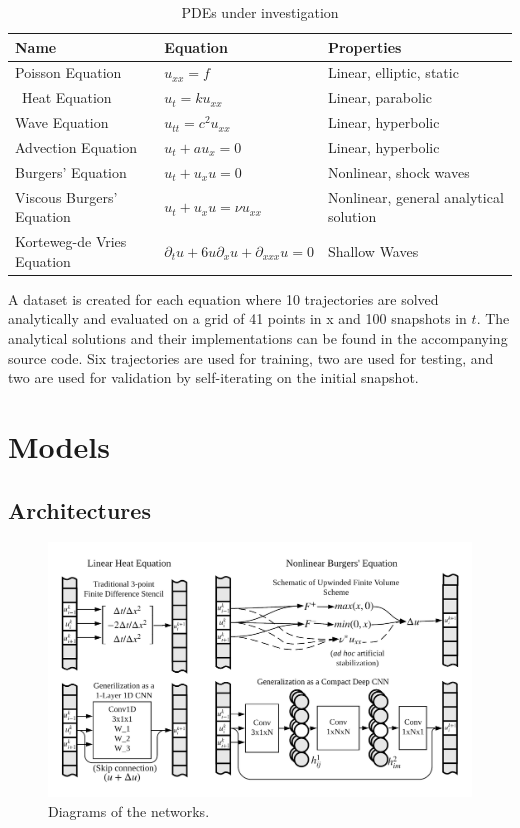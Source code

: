 \documentclass{article}
\begin{document}
\begin{table}
  \caption{\label{tab:pdes}PDEs under investigation}
  \begin{tabular}{lll}
    \hline
    Name & Equation & Properties\\
    \hline\hline
    Poisson Equation & $u_{xx} = f $ & Linear, elliptic, static \\\hline\
    Heat Equation & $u_{t} = k u_{xx} $ & Linear, parabolic \\\hline
    Wave Equation & $u_{tt} = c^2 u_{xx} $ & Linear, hyperbolic\\\hline
    Advection Equation & $u_{t} + a u_x = 0 $ & Linear, hyperbolic\\\hline
    Burgers' Equation & $u_{t} + u_x u = 0 $ & Nonlinear, shock waves \\\hline
    Viscous Burgers' Equation & $u_{t} + u_x u = \nu u_{xx} $ & Nonlinear, general analytical solution \\\hline
    Korteweg-de Vries Equation & $\partial_t u + 6 u \partial_x u + \partial_{xxx}u = 0$ & Shallow Waves \\\hline
  \end{tabular}
\end{table}

A dataset is created for each equation where 10 trajectories are solved analytically and evaluated on a grid of 41 points in x and 100 snapshots in $t$. The analytical solutions and their implementations can be found in the accompanying source code. Six trajectories are used for training, two are used for testing, and two are used for validation by self-iterating on the initial snapshot. 


\section{Models}

\subsection{Architectures}
\begin{figure}
  \centering
  \includegraphics[width=5in]{CNN_FDM.png}  
  \caption{Diagrams of the networks.}
\end{figure}
\end{document}
